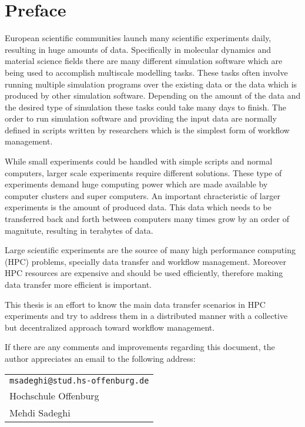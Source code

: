\chapter*{Preface}
\label{cha:preface}

European scientific communities launch many scientific experiments daily, resulting in huge amounts
of data. Specifically in molecular dynamics and material science fields there are many different
simulation software which are being used to accomplish multiscale modelling tasks. These tasks
often involve running multiple simulation programs over the existing data or the data which is
produced by other simulation software. Depending on the amount of the data and the desired type of simulation
these tasks could take many days to finish. The order to run simulation software and 
providing the input data are normally defined in scripts written by researchers which is the simplest
form of workflow management.

While small experiments could be handled with simple scripts and normal computers, larger scale experiments
require different solutions. These type of experiments demand huge computing power which are made available by
computer clusters and super computers. An important chracteristic of larger experiments is
the amount of produced data. This data which needs to be transferred back and forth
between computers many times grow by an order of magnitute, resulting in terabytes of data.

Large scientific experiments are the source of many high performance computing (HPC) problems, specially data transfer
and workflow management. Moreover HPC resources are expensive and should be used efficiently, therefore making data transfer
more efficient is important.

This thesis is an effort to know the main data transfer scenarios in HPC experiments and try to address them in
a distributed manner with a collective but decentralized approach toward workflow management.


%
%

If there are any comments and improvements regarding this document, the author
appreciates an email to the following address:

\begin{center}
\begin{tabular}{l}
\nolinkurl{msadeghi@stud.hs-offenburg.de} \\
Hochschule Offenburg\\
Mehdi Sadeghi
\end{tabular}
\end{center}




